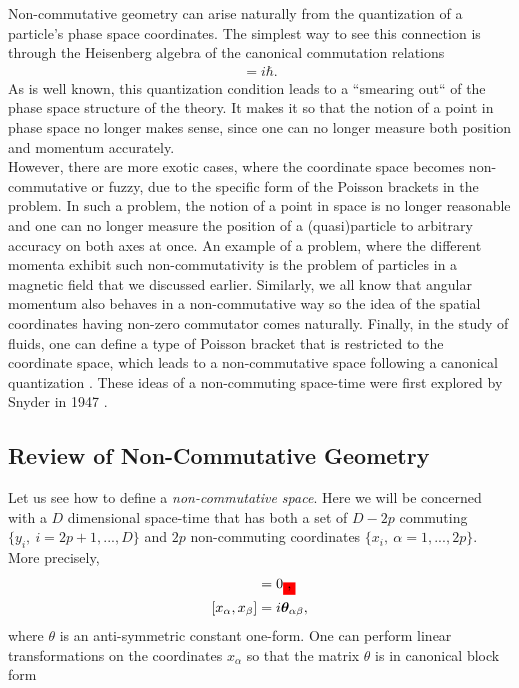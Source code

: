     Non-commutative geometry can arise naturally from the quantization of a particle's phase space coordinates. The simplest way to see this connection is through the Heisenberg algebra of the canonical commutation relations\colorbox{red}{ }
    \begin{align}
        [\hat{x}, \hat{p}] = i \hbar.
    \end{align}
    As is well known, this quantization condition leads to a ``smearing out`` of the phase space structure of the theory. It makes it so that the notion of a point in phase space no longer makes sense, since one can no longer measure both position and momentum accurately. \\
    \indent However, there are more exotic cases, where the coordinate space becomes non-commutative or fuzzy, due to the specific form of the Poisson brackets in the problem. In such a problem, the notion of a point in space is no longer reasonable and one can no longer measure the position of a (quasi)particle to arbitrary accuracy on both axes at once. An example of a problem, where the different momenta exhibit such non-commutativity is the problem of particles in a magnetic field that we discussed earlier. Similarly, we all know that angular momentum also behaves in a non-commutative way so the idea of the spatial coordinates having non-zero commutator comes naturally. Finally, in the study of fluids, one can define a type of Poisson bracket that is restricted to the coordinate space, which leads to a non-commutative space following a canonical quantization \cite{Jackiw2002}. These ideas of a non-commuting space-time were first explored by Snyder in 1947 \cite{Snyder1947_space_time, Snyder1947_EM}.


    \subsection{Review of Non-Commutative Geometry}
    Let us see how to define a \textit{non-commutative space}. Here we will be concerned with a $D$ dimensional space-time that has both a set of $D-2p$ commuting $\{ y_i, \ i=2p+1,...,D\}$ and $2p$ non-commuting coordinates $\{ x_i, \ \alpha =1,...,2p\}$. More precisely,
    \begin{align}
        [y_i, y_j] &=0\colorbox{red}{,}\\
        [x_{\alpha}, x_{\beta}] &=i \bm{\theta}_{\alpha \beta}, \label{eq:space_time_commutations}
    \end{align}
    where $\theta$ is an anti-symmetric constant one-form. One can perform linear transformations on the coordinates $x_{\alpha}$ so that the matrix $\theta$ is in canonical block form

